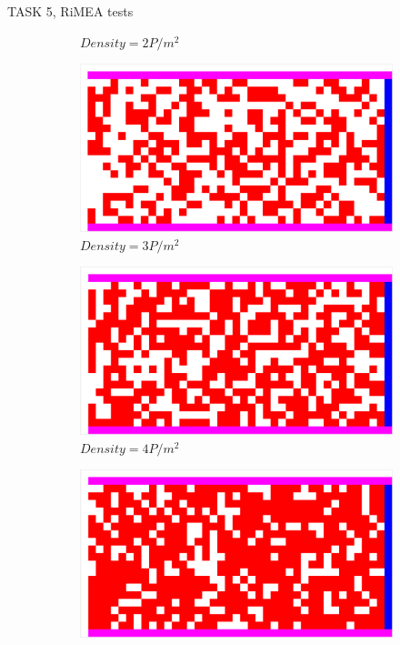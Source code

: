 \documentclass[10pt,a4paper]{article}
\begin{document}
\begin{task}{TASK 5, RiMEA tests}
\begin{figure}[htbp]
\begin{subfigure}[b]{0.31\textwidth}
    \caption{$Density = 2 P/m^2$}
    \label{fig:test2_2}
  \end{subfigure}
  \begin{subfigure}[b]{0.31\textwidth}
    \includegraphics[width=\textwidth]{pictures/test2_3.png}
    \caption{$Density = 3 P/m^2$}
    \label{fig:test2_3}
  \end{subfigure}
  \begin{subfigure}[b]{0.31\textwidth}
    \includegraphics[width=\textwidth]{pictures/test2_4.png}
    \caption{$Density = 4 P/m^2$}
    \label{fig:test2_4}
  \end{subfigure}
  \begin{subfigure}[b]{0.31\textwidth}
    \includegraphics[width=\textwidth]{pictures/test2_5.png}

\end{subfigure}
\end{figure}
\end{task}
\end{document}
